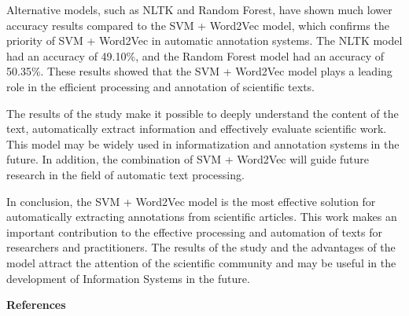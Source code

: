 \begin{multicols}{2}
Alternative models, such as NLTK and Random Forest, have shown much
lower accuracy results compared to the SVM + Word2Vec model, which
confirms the priority of SVM + Word2Vec in automatic annotation systems.
The NLTK model had an accuracy of 49.10\%, and the Random Forest model
had an accuracy of 50.35\%. These results showed that the SVM + Word2Vec
model plays a leading role in the efficient processing and annotation of
scientific texts.

The results of the study make it possible to deeply understand the
content of the text, automatically extract information and effectively
evaluate scientific work. This model may be widely used in
informatization and annotation systems in the future. In addition, the
combination of SVM + Word2Vec will guide future research in the field of
automatic text processing.

In conclusion, the SVM + Word2Vec model is the most effective solution
for automatically extracting annotations from scientific articles. This
work makes an important contribution to the effective processing and
automation of texts for researchers and practitioners. The results of
the study and the advantages of the model attract the attention of the
scientific community and may be useful in the development of Information
Systems in the future.
\end{multicols}

\begin{center}
{\bfseries References}
\end{center}

